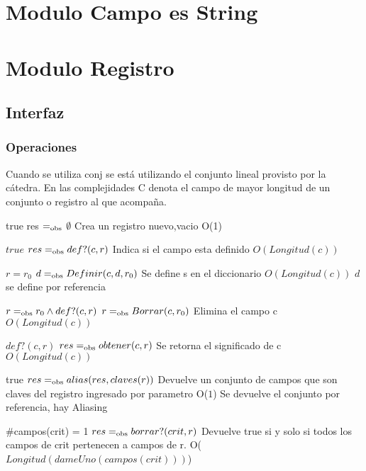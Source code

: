 
\section{Modulo Campo es String}
\section{Modulo Registro}

\subsection{Interfaz}




\subsubsection*{Operaciones}
Cuando se utiliza conj se está utilizando el conjunto lineal provisto por la cátedra. En las complejidades C denota el campo de mayor longitud de un conjunto o registro al que acompaña.

{true}
{res $=_{\mathrm{obs}}$ $\emptyset$}
{Crea un registro nuevo,vacio}
{O(1)}
{}

  {$true$}
  {$res =_{\mathrm{obs}} def?(c,r)$}
  {Indica si el campo esta definido}
  {$O(Longitud(c))$}
  {}

  {$r=r_0$}
  {$d =_{\mathrm{obs}} Definir(c, d, r_0)$}
  {Se define s en el diccionario}
  {$O(Longitud(c))$}
  {$d$ se define por referencia}

 {$r =_{\mathrm{obs}} r_0 \land def?(c,r)$}
 {$r =_{\mathrm{obs}} Borrar(c,r_0)$}
 {Elimina el campo c}
 {$O(Longitud(c))$}
 {}

 {$def?(c,r)$}
 {$res =_{\mathrm{obs}} obtener(c,r)$}
 {Se retorna el significado de c}
 {$O(Longitud(c))$}
 {}

 {true}
 {$res =_{\mathrm{obs}} alias(res, claves(r))$}
 {Devuelve un conjunto de campos que son claves del registro ingresado por parametro}
 {O($1$)}
 {Se devuelve el conjunto por referencia, hay Aliasing}

 {$\#$campos(crit) = 1}
 {$res =_{\mathrm{obs}} borrar?(crit, r)$}
 {Devuelve true si y solo si todos los campos de crit pertenecen a campos de r.}
 {O($Longitud(dameUno(campos(crit)))$)} 
 {}

